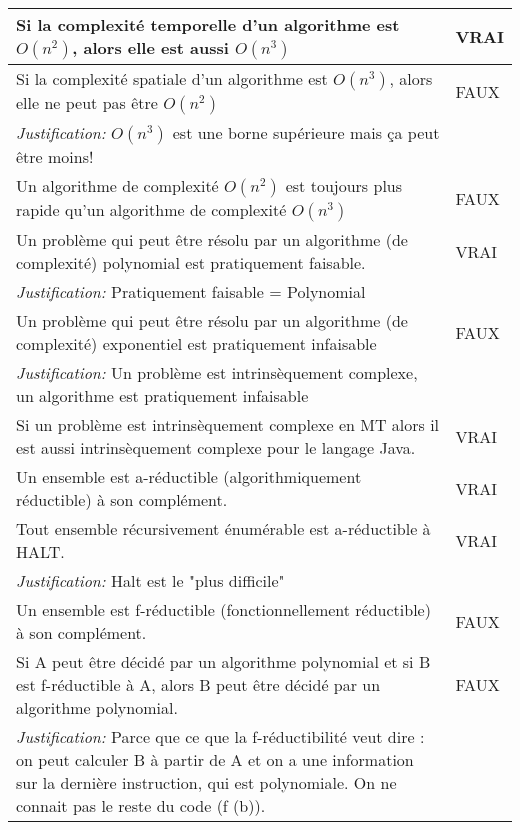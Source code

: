 \begin{longtable}{p{13cm}|l}
    Si la complexité temporelle d'un algorithme est $O(n^{2})$, alors elle est aussi $O(n^{3})$ & VRAI \\
    \hline
    Si la complexité spatiale d'un algorithme est $O(n^{3})$, alors elle ne peut pas être $O(n^{2})$  & FAUX \\
 	    \textit{Justification:} $O(n^{3})$ est une borne supérieure mais ça peut être moins!   \\
    \hline
    Un algorithme de complexité $O(n^{2})$ est toujours plus rapide qu'un algorithme de complexité $O(n^{3})$ & FAUX \\
    \hline
    Un problème qui peut être résolu par un algorithme (de complexité) polynomial est pratiquement faisable. & VRAI \\
        \textit{Justification:} Pratiquement faisable = Polynomial \\
    \hline
    Un problème qui peut être résolu par un algorithme (de complexité) exponentiel est pratiquement infaisable & FAUX \\
       \textit{Justification:} Un problème est intrinsèquement complexe, un algorithme est pratiquement infaisable \\
    \hline
    Si un problème est intrinsèquement complexe en MT alors il est aussi intrinsèquement complexe pour le langage Java.& VRAI\\
    \hline
    Un ensemble est a-réductible (algorithmiquement réductible) à son complément.& VRAI\\
    \hline
    Tout ensemble récursivement énumérable est a-réductible à HALT. & VRAI\\
      \textit{Justification:} Halt est le "plus difficile" \\
    \hline
    Un ensemble est f-réductible (fonctionnellement réductible) à son complément. & FAUX \\
    \hline
    Si A peut être décidé par un algorithme polynomial et si B est f-réductible à A, alors B peut être décidé par un algorithme polynomial. & FAUX \\
    \textit{Justification:} Parce que ce que la f-réductibilité veut dire : on peut calculer B à partir de A et on a une information sur la dernière instruction, qui est polynomiale. On ne connait pas le reste du code (f (b)). &\\
\end{longtable}